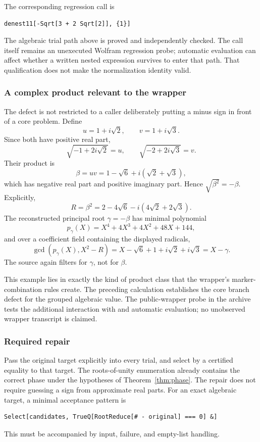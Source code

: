 \documentclass[11pt,letterpaper]{article}
\newcommand{\code}[1]{\texttt{\detokenize{#1}}}
\theoremstyle{definition}
\theoremstyle{remark}
\begin{document}
The corresponding regression call is
\begin{lstlisting}
denest11[-Sqrt[3 + 2 Sqrt[2]], {1}]
\end{lstlisting}
The algebraic trial path above is proved and independently checked. The call
itself remains an unexecuted Wolfram regression probe; automatic evaluation
can affect whether a written nested expression survives to enter that path.
That qualification does not make the normalization identity valid.

\subsubsection{A complex product relevant to the wrapper}
The defect is not restricted to a caller deliberately putting a minus sign
in front of a core problem. Define
\[
 u=1+i\sqrt2,\qquad v=1+i\sqrt3.
\]
Since both have positive real part,
\[
 \sqrt{-1+2i\sqrt2}=u,\qquad
 \sqrt{-2+2i\sqrt3}=v.
\]
Their product is
\begin{equation}
 \beta=uv=1-\sqrt6+i(\sqrt2+\sqrt3),\label{eq:complexbeta}
\end{equation}
which has negative real part and positive imaginary part. Hence
$\sqrt{\beta^2}=-\beta$. Explicitly,
\[
 R=\beta^2=2-4\sqrt6-i(4\sqrt2+2\sqrt3).
\]
The reconstructed principal root $\gamma=-\beta$ has minimal polynomial
\[
 p_\gamma(X)=X^4+4X^3+4X^2+48X+144,
\]
and over a coefficient field containing the displayed radicals,
\[
 \gcd(p_\gamma(X),X^2-R)
   =X-\sqrt6+1+i\sqrt2+i\sqrt3=X-\gamma.
\]
The source again filters for $\gamma$, not for $\beta$.

This example lies in exactly the kind of product class that the wrapper's
marker-combination rules create. The preceding calculation establishes the
core branch defect for the grouped algebraic value. The public-wrapper probe
in the archive tests the additional interaction with \code{Factorc} and
automatic evaluation; no unobserved wrapper transcript is claimed.

\subsubsection{Required repair}
Pass the original target explicitly into every trial, and select by a
certified equality to that target. The roots-of-unity enumeration already
contains the correct phase under the hypotheses of Theorem~\ref{thm:phase}.
The repair does not require guessing a sign from approximate real parts.
For an exact algebraic target, a minimal acceptance pattern is
\begin{lstlisting}
Select[candidates, TrueQ[RootReduce[# - original] === 0] &]
\end{lstlisting}
This must be accompanied by input, failure, and empty-list handling.
\end{document}
